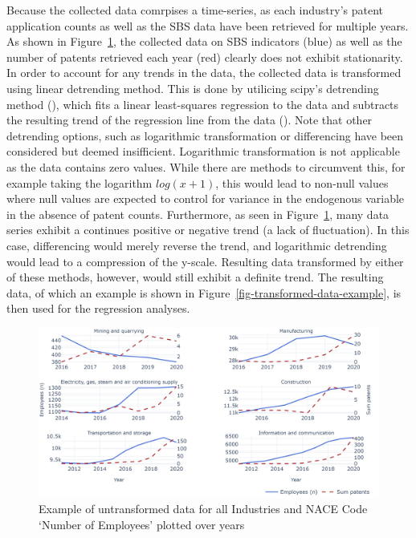 \documentclass[
  11,
  a4paperpaper,
]{article}
\begin{document}
Because the collected data comrpises a time-series, as each industry's
patent application counts as well as the SBS data have been retrieved
for multiple years. As shown in
Figure~\ref{fig-untransformed-data-example}, the collected data on SBS
indicators (blue) as well as the number of patents retrieved each year
(red) clearly does not exhibit stationarity. In order to account for any
trends in the data, the collected data is transformed using linear
detrending method. This is done by utilicing scipy's detrending method
(), which fits
a linear least-squares regression to the data and subtracts the
resulting trend of the regression line from the data
(). Note that other detrending options, such as
logarithmic transformation or differencing have been considered but
deemed insifficient. Logarithmic transformation is not applicable as the
data contains zero values. While there are methods to circumvent this,
for example taking the logarithm \(log(x+1)\), this would lead to
non-null values where null values are expected to control for variance
in the endogenous variable in the absence of patent counts. Furthermore,
as seen in Figure~\ref{fig-untransformed-data-example}, many data series
exhibit a continues positive or negative trend (a lack of fluctuation).
In this case, differencing would merely reverse the trend, and
logarithmic detrending would lead to a compression of the y-scale.
Resulting data transformed by either of these methods, however, would
still exhibit a definite trend. The resulting data, of which an example
is shown in Figure~\ref{fig-transformed-data-example}, is then used for
the regression analyses.

\begin{figure}[H]

{\centering \includegraphics{rieg2023_files/figure-pdf/fig-untransformed-data-example-output-1.jpeg}

}

\caption{\label{fig-untransformed-data-example}Example of untransformed
data for all Industries and NACE Code `Number of Employees' plotted over
years}

\end{figure}
\end{document}
